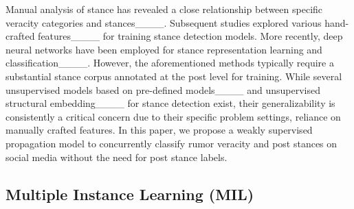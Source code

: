 Manual analysis of stance has revealed a close relationship between specific veracity categories and stances____. Subsequent studies explored various hand-crafted features____ 
for training stance detection models. More recently, deep neural networks have been employed for stance representation learning and classification____.
However, the aforementioned methods typically require a substantial stance corpus annotated at the post level for training. While several unsupervised models based on pre-defined models____ and unsupervised structural embedding____ for stance detection exist, their generalizability is consistently a critical concern due to their specific problem settings, reliance on manually crafted features.
In this paper, we propose a weakly supervised propagation model to concurrently classify rumor veracity and post stances on social media without the need for post stance labels. 

\subsection{Multiple Instance Learning (MIL)}

